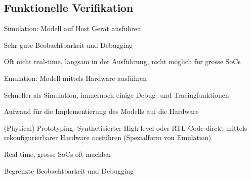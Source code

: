 \subsection{Funktionelle Verifikation}
\begin{compactitem}
    \item Simulation: Modell auf Host Gerät ausführen
    \begin{compactitem}
        \item Sehr gute Beobachtbarkeit und Debugging
        \item Oft nicht real-time, langsam in der Ausführung, nicht möglich für grosse SoCs
    \end{compactitem}
    \item Emulation: Modell mittels Hardware ausführen
    \begin{compactitem}
        \item Schneller als Simulation, immernoch einige Debug- und Tracingfunktionen
        \item Aufwand für die Implementierung des Modells auf die Hardware
    \end{compactitem}
    \item (Physical) Prototyping: Synthetisierter High level oder RTL Code direkt mittels rekonfigurierbarer Hardware ausführen (Spezialform von Emulation)
    \begin{compactitem}
        \item Real-time, grosse SoCs oft machbar
        \item Begrenzte Beobachtbarkeit und Debugging
    \end{compactitem}
\end{compactitem}
